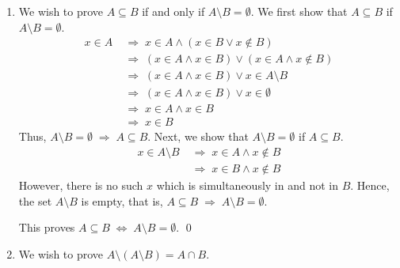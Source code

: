 \documentclass[10pt]{article}
\begin{document}
\begin{enumerate}
		This proves $A \subseteq B \;\Leftrightarrow\; A \cap B = A$. \qed
		
		
		\item
		We wish to prove $A \subseteq B$ if and only if $A \setminus B = \emptyset$. We first show that $A \subseteq B$ if $A \setminus B = \emptyset$.
		\begin{align*}
			x \in A
			\;&\Rightarrow\; x \in A \land (x \in B \lor x \notin B)\\
			\;&\Rightarrow\; (x \in A \land x \in B) \lor (x \in A \land x \notin B)\\
			\;&\Rightarrow\; (x \in A \land x \in B) \lor x \in A \setminus B\\
			\;&\Rightarrow\; (x \in A \land x \in B) \lor x \in \emptyset   \tag{$A \setminus B = \emptyset$}\\
			\;&\Rightarrow\; x \in A \land x \in B                          \tag{$x \in A$}\\
			\;&\Rightarrow\; x \in B
		\end{align*}
		Thus, $A \setminus B = \emptyset \;\Rightarrow\; A \subseteq B$. Next, we show that $A \setminus B = \emptyset$ if $A \subseteq B$.
		\begin{align*}
			x \in A \setminus B
			\;&\Rightarrow\; x \in A \land x \notin B\\
			\;&\Rightarrow\; x \in B \land x \notin B                   \tag{$A \subseteq B$}
		\end{align*}
		However, there is no such $x$ which is simultaneously in and not in $B$. Hence, the set $A \setminus B$ is empty, that is,
		$A \subseteq B \;\Rightarrow\; A \setminus B = \emptyset$.
		
		This proves $A \subseteq B \;\Leftrightarrow\; A \setminus B = \emptyset$. \qed
		
		
		\item
		We wish to prove $A \setminus (A \setminus B) = A \cap B$.
		

\end{enumerate}
\end{document}
